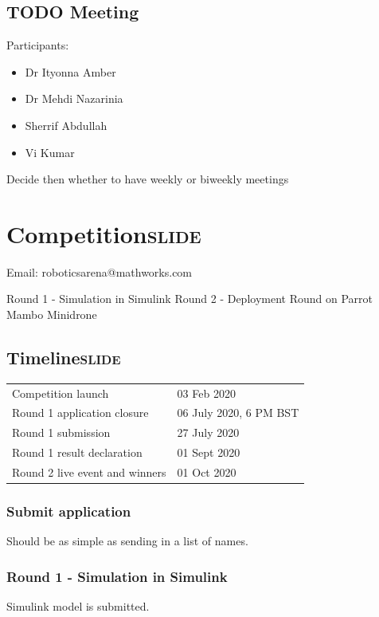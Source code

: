 \documentclass[11pt]{article}
\begin{document}
\subsection{{\bfseries\sffamily TODO} Meeting}
\label{sec:orgacf31a4}
Participants:
\begin{itemize}
\item Dr Ityonna Amber
\item Dr Mehdi Nazarinia
\item Sherrif Abdullah
\item Vi Kumar
\end{itemize}

Decide then whether to have weekly or biweekly meetings

\section{Competition\hfill{}\textsc{slide}}
\label{sec:org5e75a20}
Email: roboticsarena@mathworks.com

Round 1 - Simulation in Simulink
Round 2 - Deployment Round on Parrot Mambo Minidrone

\subsection{Timeline\hfill{}\textsc{slide}}
\label{sec:org5faaa89}

\begin{center}
\begin{tabular}{ll}
Competition launch & 03 Feb 2020\\
Round 1 application closure & 06 July 2020, 6 PM BST\\
Round 1 submission & 27 July 2020\\
Round 1 result declaration & 01 Sept 2020\\
Round 2 live event and winners & 01 Oct 2020\\
\end{tabular}
\end{center}

\subsubsection{Submit application}
\label{sec:org339af3d}
Should be as simple as sending in a list of names.

\subsubsection{Round 1 - Simulation in Simulink}
\label{sec:org9e6fe04}
Simulink model is submitted.
\end{document}
